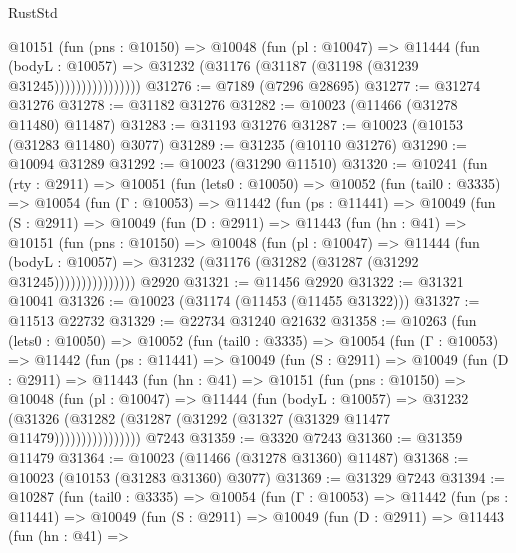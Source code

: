 \begin{lexlean}{RustStd}
\begin{coremodule}
                    @10151
                      (fun (pns : @10150) =>
                      @10048
                        (fun (pl : @10047) =>
                        @11444
                          (fun (bodyL : @10057) =>
                          @31232 (@31176 (@31187 (@31198 (@31239 @31245))))))))))))))))
@31276 := @7189 (@7296 @28695)
@31277 := @31274 @31276
@31278 := @31182 @31276
@31282 := @10023 (@11466 (@31278 @11480) @11487)
@31283 := @31193 @31276
@31287 := @10023 (@10153 (@31283 @11480) @3077)
@31289 := @31235 (@10110 @31276)
@31290 := @10094 @31289
@31292 := @10023 (@31290 @11510)
@31320 := @10241
    (fun (rty : @2911) =>
    @10051
      (fun (lets0 : @10050) =>
      @10052
        (fun (tail0 : @3335) =>
        @10054
          (fun (Γ : @10053) =>
          @11442
            (fun (ps : @11441) =>
            @10049
              (fun (S : @2911) =>
              @10049
                (fun (D : @2911) =>
                @11443
                  (fun (hn : @41) =>
                  @10151
                    (fun (pns : @10150) =>
                    @10048
                      (fun (pl : @10047) =>
                      @11444
                        (fun (bodyL : @10057) =>
                        @31232 (@31176 (@31282 (@31287 (@31292 @31245)))))))))))))))
    @2920
@31321 := @11456 @2920
@31322 := @31321 @10041
@31326 := @10023 (@31174 (@11453 (@11455 @31322)))
@31327 := @11513 @22732
@31329 := @22734 @31240 @21632
@31358 := @10263
    (fun (lets0 : @10050) =>
    @10052
      (fun (tail0 : @3335) =>
      @10054
        (fun (Γ : @10053) =>
        @11442
          (fun (ps : @11441) =>
          @10049
            (fun (S : @2911) =>
            @10049
              (fun (D : @2911) =>
              @11443
                (fun (hn : @41) =>
                @10151
                  (fun (pns : @10150) =>
                  @10048
                    (fun (pl : @10047) =>
                    @11444
                      (fun (bodyL : @10057) =>
                      @31232
                        (@31326
                          (@31282 (@31287 (@31292 (@31327 (@31329 @11477 @11479))))))))))))))))
    @7243
@31359 := @3320 @7243
@31360 := @31359 @11479
@31364 := @10023 (@11466 (@31278 @31360) @11487)
@31368 := @10023 (@10153 (@31283 @31360) @3077)
@31369 := @31329 @7243
@31394 := @10287
    (fun (tail0 : @3335) =>
    @10054
      (fun (Γ : @10053) =>
      @11442
        (fun (ps : @11441) =>
        @10049
          (fun (S : @2911) =>
          @10049
            (fun (D : @2911) =>
            @11443
              (fun (hn : @41) =>

\end{coremodule}
\end{lexlean}
